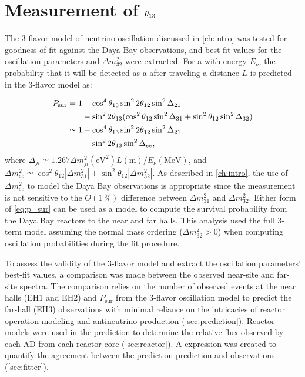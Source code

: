 \chapter{Measurement of \texorpdfstring{$\theta_{13}$}{theta13}}
\label{ch:analysis}

The 3-flavor model of neutrino oscillation discussed in \cref{ch:intro}
was tested for goodness-of-fit against the Daya Bay observations,
and best-fit values for the oscillation parameters \thetaot{} and $\Delta m^2_{32}${}
were extracted.
For a \nuebar{} with energy $E_\nu$,
the probability that it will be detected as a \nuebar{}
after traveling a distance $L$ is predicted in the 3-flavor model as:

\begin{align}\label{eq:p_sur}
    \begin{split}
        P_\text{sur} = 1 &- \cos^4\theta_{13}\sin^22\theta_{12}\sin^2\Delta_{21} \\
                         &- \sin^22\theta_{13}(\cos^2\theta_{12}\sin^2\Delta_{31}
                     + \sin^2\theta_{12}\sin^2\Delta_{32}) \\
        \simeq 1 &- \cos^4\theta_{13}\sin^22\theta_{12}\sin^2\Delta_{21} \\
                 &- \sin^22\theta_{13}\sin^2\Delta_{ee},
\end{split}
\end{align}
where
$\Delta_{ji} \simeq 1.267 \Delta m^2_{ji} (\si{\eV}^2) L(\si{\m})/E_\nu (\si{\MeV})$,
and
$\Delta m^2_{ee} \simeq \cos^2\theta_{12}\left|\Delta m^2_{31}\right| +
\sin^2\theta_{12}\left|\Delta m^2_{32}\right|$.
As described in \cref{ch:intro},
the use of $\Delta m^2_{ee}$ to model the Daya Bay observations
is appropriate since the measurement is not sensitive
to the $O(\SI{1}{\percent})$ difference between $\Delta m^2_{31}$ and $\Delta m^2_{32}$.
Either form of \cref{eq:p_sur} can be used as a model
to compute the \nuebar{} survival probability
from the Daya Bay reactors to the near and far halls.
This analysis used the full 3-term model
assuming the normal mass ordering ($\Delta m^2_{32} > 0$)
when computing oscillation probabilities during the fit procedure.

To assess the validity of the 3-flavor model and extract the oscillation parameters'
best-fit values,
a comparison was made between the observed near-site and far-site \nuebar{} spectra.
The comparison relies on the number of observed events at the near halls (EH1 and EH2)
and $P_\text{sur}$ from the 3-flavor oscillation model
to predict the far-hall (EH3) observations
with minimal reliance on the intricacies of reactor operation modeling
and antineutrino production (\cref{sec:prediction}).
Reactor models were used in the prediction
to determine the relative \nuebar{} flux
observed by each AD from each reactor core (\cref{sec:reactor}).
A \chisquare{} expression was created to quantify the agreement
between the prediction prediction and observations (\cref{sec:fitter}).

